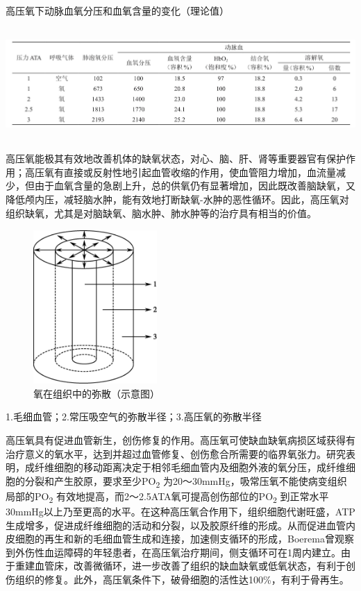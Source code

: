 \begin{table}[htbp]
\centering
\caption{高压氧下动脉血氧分压和血氧含量的变化（理论值）}
\label{tab144-1}
\includegraphics[width=6.67708in,height=1.67708in]{./images/Image00533.jpg}
\end{table}


高压氧能极其有效地改善机体的缺氧状态，对心、脑、肝、肾等重要器官有保护作用；高压氧有直接或反射性地引起血管收缩的作用，使血管阻力增加，血流量减少，但由于血氧含量的急剧上升，总的供氧仍有显著增加，因此既改善脑缺氧，又降低颅内压，减轻脑水肿，能有效地打断缺氧-水肿的恶性循环。因此，高压氧对组织缺氧，尤其是对脑缺氧、脑水肿、肺水肿等的治疗具有相当的价值。

\begin{figure}[!htbp]
 \centering
 \includegraphics[width=1.85417in,height=2.3125in]{./images/Image00534.jpg}
 \captionsetup{justification=centering}
 \caption{氧在组织中的弥散（示意图）}
 \label{fig144-1}
  \end{figure} 

1.毛细血管；2.常压吸空气的弥散半径；3.高压氧的弥散半径

高压氧具有促进血管新生，创伤修复的作用。高压氧可使缺血缺氧病损区域获得有治疗意义的氧水平，达到并超过血管修复、创伤愈合所需要的临界氧张力。研究表明，成纤维细胞的移动距离决定于相邻毛细血管内及细胞外液的氧分压，成纤维细胞的分裂和产生胶原，要求至少PO\textsubscript{2}
为20～30mmHg，吸常压氧不能使病变组织局部的PO\textsubscript{2}
有效地提高，而2～2.5ATA氧可提高创伤部位的PO\textsubscript{2}
到正常水平30mmHg以上乃至更高的水平。在这种高压氧合作用下，组织细胞代谢旺盛，ATP生成增多，促进成纤维细胞的活动和分裂，以及胶原纤维的形成。从而促进血管内皮细胞的再生和新的毛细血管生成和连接，加速侧支循环的形成，Boerema曾观察到外伤性血运障碍的年轻患者，在高压氧治疗期间，侧支循环可在1周内建立。由于重建血管床，改善微循环，进一步改善了组织的缺血缺氧或低氧状态，有利于创伤组织的修复。此外，高压氧条件下，破骨细胞的活性达100\%，有利于骨再生。

